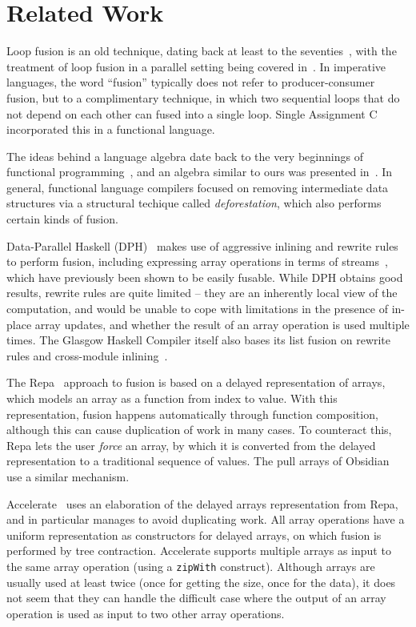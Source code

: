 \documentclass{sigplanconf}  %
\begin{document}
\section{Related Work}
\label{sec:RelWork}

Loop fusion is an old technique, dating back at least to the
seventies~\cite{cheatham1977programming}, with the treatment of loop
fusion in a parallel setting being covered
in~\cite{midki1990issues}. In imperative languages, the word
``fusion'' typically does not refer to producer-consumer fusion, but
to a complimentary technique, in which two sequential loops that do
not depend on each other can fused into a single loop.  Single
Assignment C~\cite{grelck2006sac} incorporated this in a functional
language.

The ideas behind a language algebra date back to the very beginnings
of functional programming~\cite{Backus:1978:PLV:359576.359579}, and an
algebra similar to ours was presented in~\cite{bird1989algebraic}.  In
general, functional language compilers focused on removing
intermediate data structures via a structural techique called {\em
  deforestation}, which also performs certain kinds of
fusion\cite{gill1993short}.

Data-Parallel Haskell (DPH)~\cite{chakravarty2007data} makes use of
aggressive inlining and rewrite rules to perform fusion, including
expressing array operations in terms of
streams~\cite{coutts2007rewriting}, which have previously been shown
to be easily fusable.  While DPH obtains good results, rewrite rules
are quite limited -- they are an inherently local view of the
computation, and would be unable to cope with limitations in the
presence of in-place array updates, and whether the result of an array
operation is used multiple times.  The Glasgow Haskell Compiler itself
also bases its list fusion on rewrite rules and cross-module
inlining~\cite{jones2001playing}.

The Repa~\cite{keller2010regular} approach to fusion is based on a
delayed representation of arrays, which models an array as a function
from index to value.  With this representation, fusion happens
automatically through function composition, although this can cause
duplication of work in many cases.  To counteract this, Repa lets the
user {\em force} an array, by which it is converted from the
delayed representation to a traditional sequence of values.  The pull
arrays of Obsidian~\cite{claessen2012expressive} use a similar
mechanism.

Accelerate~\cite{mcdonell2013optimising} uses an elaboration of the
delayed arrays representation from Repa, and in particular manages to
avoid duplicating work.  All array operations have a uniform
representation as constructors for delayed arrays, on which fusion is
performed by tree contraction.  Accelerate supports multiple arrays as
input to the same array operation (using a {\tt zipWith} construct).
Although arrays are usually used at least twice (once for getting the
size, once for the data), it does not seem that they can handle the difficult
case where the output of an array operation is used as input to two
other array operations.
\end{document}
